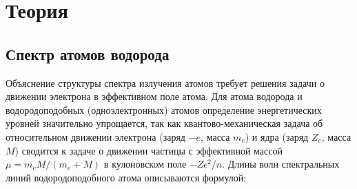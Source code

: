 

\newcommand{\formula}[2]
{
    \begin{equation}\label{#1}
        #2
    \end{equation}
}

\newcommand{\mth}[1]
{
    \begin{math}
        #1
    \end{math}
}

\newcommand{\ruB}[1]
{
    _{\text{#1}}
}

\setcounter{PicsCounter}{1}

\newcommand{\pic}[3]{
    \begin{center}
        \begin{minipage}[h!]{#1}
            \begin{center}

                \texttt{[image: \#2]}
                \textit{Рис \arabic{PicsCounter}. #3}

            \end{center}
        \end{minipage}
    \end{center}

    \stepcounter{PicsCounter}
}

\setcounter{TablesCounter}{1}

\newcommand{\tableLable}[1]{
    \textit{Таблица \arabic{TablesCounter}: #1}

    \stepcounter{TablesCounter}
}

\section{Теория}

\subsection{Спектр атомов водорода}

Объяснение структуры спектра излучения атомов требует решения задачи о движении электрона в эффективном поле атома.
Для атома водорода и водородоподобных (одноэлектронных) атомов определение энергетических уровней значительно
упрощается, так как квантово-механическая задача об относительном движении электрона (заряд $ -e $, масса $ m_e $)
и ядра (заряд $ Z_e $, масса $ M $) сводится к задаче о движении частицы с эффективной массой $ \mu = m_e M /(m_e+M) $
в кулоновском поле $ - Z \epsilon^2 / n $. Длины волн спектральных линий водородоподобного атома описываются формулой:

